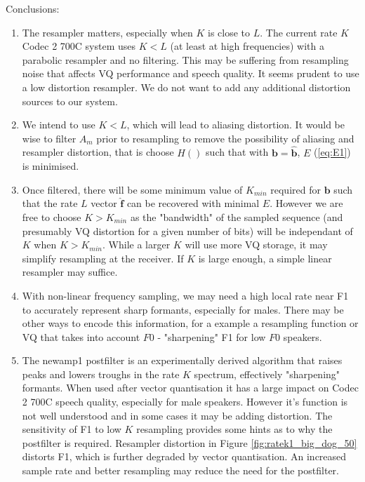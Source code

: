 \documentclass{article}
\begin{document}
Conclusions:
\begin{enumerate}
\item The resampler matters, especially when $K$ is close to $L$.  The current rate $K$ Codec 2 700C system uses $K < L$ (at least at high frequencies) with a parabolic resampler and no filtering.  This may be suffering from resampling noise that affects VQ performance and speech quality. It seems prudent to use a low distortion resampler.  We do not want to add any additional distortion sources to our system.

\item We intend to use $K<L$, which will lead to aliasing distortion.  It would be wise to filter $A_{m}$ prior to resampling to remove the possibility of aliasing and resampler distortion, that is choose $H()$ such that with $\mathbf{b}=\hat{\mathbf{b}}$, $E$ (\ref{eq:E1}) is minimised.

\item Once filtered, there will be some minimum value of $K_{min}$ required for $\mathbf{b}$ such that the rate $L$ vector $\hat{\mathbf{f}}$ can be recovered with minimal $E$. However we are free to choose $K>K_{min}$ as the "bandwidth" of the sampled sequence (and presumably VQ distortion for a given number of bits) will be independant of $K$ when $K>K_{min}$.  While a larger $K$ will use more VQ storage, it may simplify resampling at the receiver.  If $K$ is large enough, a simple linear resampler may suffice.

\item With non-linear frequency sampling, we may need a high local rate near F1 to accurately represent sharp formants, especially for males.  There may be other ways to encode this information, for a example a resampling function or VQ that takes into account $F0$ - "sharpening" F1 for low $F0$ speakers.

\item The newamp1 postfilter is an experimentally derived algorithm that raises peaks and lowers troughs in the rate $K$ spectrum, effectively "sharpening" formants.  When used after vector quantisation it has a large impact on Codec 2 700C speech quality, especially for male speakers.  However it's function is not well understood and in some cases it may be adding distortion.  The sensitivity of F1 to low $K$ resampling provides some hints as to why the postfilter is required.  Resampler distortion in Figure \ref{fig:ratek1_big_dog_50} distorts F1, which is further degraded by vector quantisation.  An increased sample rate and better resampling may reduce the need for the postfilter.

\end{enumerate}
\end{document}
